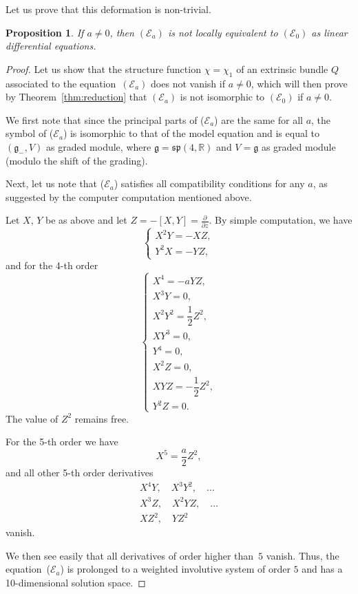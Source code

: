 \documentclass[pdftex]{sigma}%
\newcommand{\R}{\mathbb R}
\newcommand{\E}{\mathcal E}
\newcommand{\g}{\mathfrak g}
\newcommand{\fsp}{\mathfrak{sp}}
\newtheorem{prop}[thm]{Proposition}
\numberwithin{equation}{section}
\begin{document}
Let us prove that this deformation is non-trivial.
\begin{prop}\label{deformCase2}
	If $a\ne 0$, then $(\E_a)$ is not locally equivalent to $(\E_0)$ as linear differential equations.
\end{prop}	
\begin{proof}
	Let us show that the structure function $\chi=\chi_1$ of an extrinsic bundle $Q$ associated to the equation~$(\E_a)$ does not vanish if $a\ne 0$, which will then prove by Theorem~\ref{thm:reduction} that $(\E_a)$ is not isomorphic to $(\E_0)$ if $a\ne 0$.
	
	We first note that since the principal parts of ($\E_a$) are the same for all $a$, the symbol of ($\E_a$) is isomorphic to that of the model equation and is equal to $(\g_{-},V)$ as graded module, where $\g=\fsp(4,\R)$ and $V=\g$ as graded module (modulo the shift of the grading).
	
	Next, let us note that ($\E_a$) satisfies all compatibility conditions for any $a$, as suggested by the computer computation mentioned above.
	
	Let $X$, $Y$ be as above and let $Z=-[X,Y]=\frac{\partial}{\partial z}$. By simple computation, we have
	\[
	\begin{cases}
	X^2Y=-XZ,\\
	Y^2X = -YZ,
	\end{cases}
	\]
	and for the 4-th order
	\[
	\begin{cases}
	X^4 = -aYZ,\\
	X^3Y = 0,\\[1ex]
	X^2Y^2 =\dfrac12 Z^2,\\[1ex]
	XY^3=0,\\
	Y^4=0,\\
	X^2Z = 0,\\[1ex]
	XYZ = -\dfrac12 Z^2,\\[1ex]
	Y^2Z = 0.
	\end{cases}
	\]
	The value of $Z^2$ remains free.
	
	For the 5-th order we have
	\[
	X^5 = \frac{a}{2} Z^2,
	\]
	and all other 5-th order derivatives
	\begin{gather*}
	X^4Y,\quad X^3Y^2,\quad \dots \\
	X^3Z,\quad X^2YZ,\quad \dots \\
	XZ^2,\quad YZ^2
	\end{gather*}
	vanish.
	
	We then see easily that all derivatives of order higher than~$5$ vanish. Thus, the equation~($\E_a$) is prolonged to a weighted involutive system of order $5$ and has a 10-dimensional solution space.
	

\end{proof}
\end{document}
